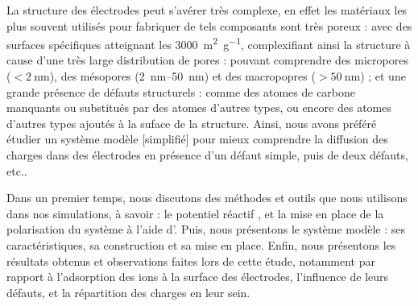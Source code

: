 La structure des électrodes peut s'avérer très complexe\cite{bo_design_2018}\cite{iro_brief_2016}, en effet les matériaux les plus souvent utilisés pour fabriquer de tels composants sont très poreux : avec des surfaces spécifiques atteignant les \qty{3000}{\square \meter \per \gram}, complexifiant ainsi la structure à cause d'une très large distribution de pores : pouvant comprendre des micropores ($< \qty{2}{\nano\meter}$), des mésopores (\qtyrange[range-units = single]{2}{50}{\nano \meter}) et des macropopres ($> \qty{50}{\nano \meter}$) ; et une grande présence de défauts structurels : comme des atomes de carbone manquants ou substitués par des atomes d'autres types, ou encore des atomes d'autres types ajoutés à la suface de la structure.
Ainsi, nous avons préféré étudier un système modèle [simplifié] pour mieux comprendre la diffusion des charges dans des électrodes en présence d'un défaut simple, puis de deux défauts, etc..

Dans un premier temps, nous discutons des méthodes et outils que nous utilisons dans nos simulations, à savoir : le potentiel réactif \reaxff{}\cite{van_duin_reaxff_2001}\cite{russo_atomistic-scale_2011}\cite{senftle_reaxff_2016}, et la mise en place de la polarisation du système à l'aide d'\echemdid{}\cite{onofrio_voltage_2015}.
Puis, nous présentons le système modèle : ses caractéristiques, sa construction et sa mise en place.
Enfin, nous présentons les résultats obtenus et observations faites lors de cette étude, notamment par rapport à l'adsorption des ions à la surface des électrodes, l'influence de leurs défauts, et la répartition des charges en leur sein.

